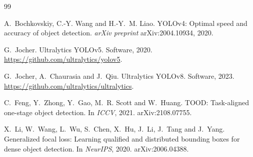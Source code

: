 \begin{thebibliography}{99}

A.~Bochkovskiy, C.-Y. Wang and H.-Y.~M. Liao.
YOLOv4: Optimal speed and accuracy of object detection.
\textit{arXiv preprint} arXiv:2004.10934, 2020.

G.~Jocher.
Ultralytics YOLOv5. Software, 2020. \url{https://github.com/ultralytics/yolov5}.

G.~Jocher, A.~Chaurasia and J.~Qiu.
Ultralytics YOLOv8. Software, 2023. \url{https://github.com/ultralytics/ultralytics}.

C.~Feng, Y.~Zhong, Y.~Gao, M.~R. Scott and W.~Huang.
TOOD: Task-aligned one-stage object detection.
In \textit{ICCV}, 2021. arXiv:2108.07755.

X.~Li, W.~Wang, L.~Wu, S.~Chen, X.~Hu, J.~Li, J.~Tang and J.~Yang.
Generalized focal loss: Learning qualified and distributed bounding boxes for dense object detection.
In \textit{NeurIPS}, 2020. arXiv:2006.04388.

\end{thebibliography}
